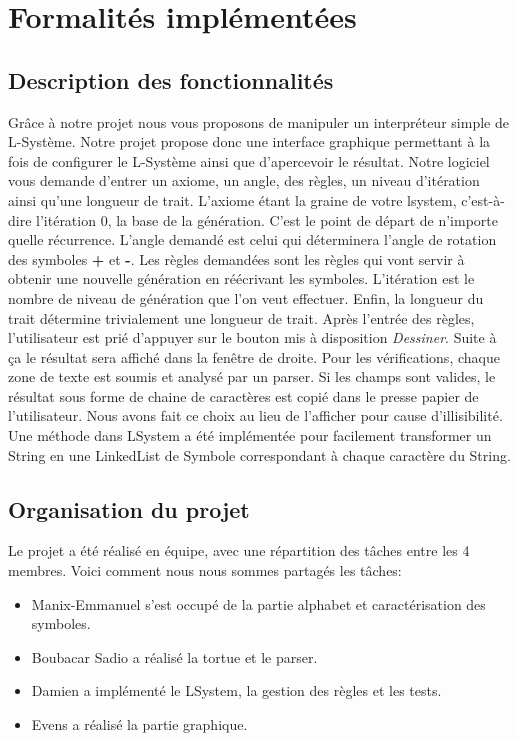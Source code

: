 \documentclass[12pt]{article}
\begin{document}
\section{Formalités implémentées}

\subsection{Description des fonctionnalités}

Grâce à notre projet nous vous proposons de manipuler un interpréteur simple de L-Système.
Notre projet propose donc une interface graphique permettant à la fois de configurer le L-Système ainsi que d'apercevoir le résultat. Notre logiciel vous demande d'entrer un axiome, un angle, des règles, un niveau d'itération ainsi qu'une longueur de trait.
L'axiome étant la graine de votre lsystem, c'est-à-dire l'itération 0, la base de la génération. C'est le point de départ de n'importe quelle récurrence.
L'angle demandé est celui qui déterminera l'angle de rotation des symboles \textbf{+} et \textbf{-}.
Les règles demandées sont les règles qui vont servir à obtenir une nouvelle génération en réécrivant les symboles.
L'itération est le nombre de niveau de génération que l'on veut effectuer.
Enfin, la longueur du trait détermine trivialement une longueur de trait.
Après l'entrée des règles, l'utilisateur est prié d'appuyer sur le bouton mis à disposition \textit{Dessiner}. Suite à ça le résultat sera affiché dans la fenêtre de droite.
Pour les vérifications, chaque zone de texte est soumis et analysé par un parser.
Si les champs sont valides, le résultat sous forme de chaine de caractères est copié dans le presse papier de l'utilisateur. Nous avons fait ce choix au lieu de l'afficher pour cause d'illisibilité.
Une méthode dans LSystem a été implémentée pour facilement transformer un String en une LinkedList de Symbole correspondant à chaque caractère du String.



\subsection{Organisation du projet}

Le projet a été réalisé en équipe, avec une répartition des tâches entre les 4 membres. Voici comment nous nous sommes partagés les tâches:
\begin{itemize}
	\item Manix-Emmanuel s’est occupé de la partie alphabet et caractérisation des symboles.
	\item Boubacar Sadio a réalisé la tortue et le parser.
	\item Damien a implémenté le LSystem, la gestion des règles et les tests.
	\item Evens a réalisé la partie graphique.
\end{itemize}
\end{document}
